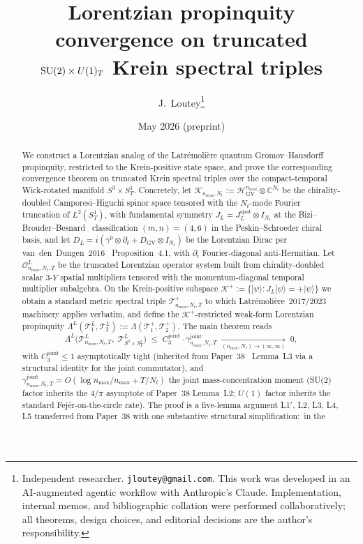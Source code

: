 \documentclass[11pt,a4paper]{article}
\title{Lorentzian propinquity convergence on truncated\\
$\SU(2)\times\Uone_{T}$ Krein spectral triples}
\author{J.~Loutey\thanks{Independent researcher. \texttt{jloutey@gmail.com}.
This work was developed in an AI-augmented agentic workflow with
Anthropic's Claude. Implementation, internal memos, and bibliographic
collation were performed collaboratively; all theorems, design choices,
and editorial decisions are the author's responsibility.}}
\date{May 2026 (preprint)}
\theoremstyle{plain}
\theoremstyle{definition}
\newcommand{\nmax}{n_{\max}}
\newcommand{\Nt}{N_{t}}
\newcommand{\SoneT}{S^{1}_{T}}
\newcommand{\Manifold}{S^{3}\times S^{1}_{T}}
\newcommand{\Krein}{\mathcal{K}}
\newcommand{\Op}{\mathcal{O}}
\newcommand{\Tcal}{\mathcal{T}}
\newcommand{\C}{\mathbb{C}}
\newcommand{\Uone}{U(1)}
\newcommand{\DGV}{D_{\mathrm{GV}}}
\newcommand{\DL}{D_{L}}
\newcommand{\JL}{J_{L}}
\newcommand{\Lprop}{\Lambda^{L}}
\newcommand{\Lambdab}{\Lambda}
\newcommand{\gammajoint}{\gamma^{\mathrm{joint}}}
\newcommand{\Cthreejoint}{C_{3}^{\mathrm{joint}}}
\newcommand{\HGV}{\mathcal{H}_{\mathrm{GV}}}
\newcommand{\Kplus}{\Krein^{+}}
\newcommand{\spat}{\mathrm{spat}}
\begin{document}
\maketitle

\begin{abstract}
We construct a Lorentzian analog of the Latr\'emoli\`ere
quantum Gromov--Hausdorff propinquity, restricted to the
Krein-positive state space, and prove the corresponding convergence
theorem on truncated Krein spectral triples over the compact-temporal
Wick-rotated manifold $\Manifold$. Concretely, let
$\Krein_{\nmax,\Nt} := \HGV^{\nmax} \otimes \C^{\Nt}$ be the
chirality-doubled Camporesi--Higuchi spinor space tensored with the
$\Nt$-mode Fourier truncation of $L^{2}(\SoneT)$, with fundamental
symmetry $\JL = \JL^{\spat} \otimes I_{\Nt}$ at the
Bizi--Brouder--Besnard~\cite{bizi_brouder_besnard2018} classification
$(m, n) = (4, 6)$ in the Peskin--Schroeder chiral basis, and let
$\DL = i(\gamma^{0} \otimes \partial_{t} + \DGV \otimes I_{\Nt})$
be the Lorentzian Dirac per van~den~Dungen~2016~\cite{vandungen2016}
Proposition~4.1, with $\partial_{t}$ Fourier-diagonal anti-Hermitian.
Let $\Op^{L}_{\nmax,\Nt,T}$ be the truncated Lorentzian operator
system built from chirality-doubled scalar $3$-$Y$ spatial multipliers
tensored with the momentum-diagonal temporal multiplier subalgebra.
On the Krein-positive subspace $\Kplus := \{|\psi\rangle :
\JL|\psi\rangle = +|\psi\rangle\}$ we obtain a standard metric
spectral triple $\Tcal_{\nmax,\Nt,T}^{+}$ to which
Latr\'emoli\`ere~2017/2023~\cite{latremoliere_metric_st_2017}
machinery applies verbatim, and define the $\Kplus$-restricted
weak-form Lorentzian propinquity $\Lprop(\Tcal_{1}^{L}, \Tcal_{2}^{L})
:= \Lambdab(\Tcal_{1}^{+}, \Tcal_{2}^{+})$. The main theorem reads
\begin{equation*}
   \Lprop\!\bigl(\Tcal^{L}_{\nmax,\Nt,T},\;
                 \Tcal^{L}_{\Manifold}\bigr)
   \;\le\; \Cthreejoint \cdot \gammajoint_{\nmax,\Nt,T}
   \;\xrightarrow[(\nmax,\Nt)\to(\infty,\infty)]{}\; 0,
\end{equation*}
with $\Cthreejoint \le 1$ asymptotically tight (inherited from
Paper~38~\cite{paper38} Lemma~L3 via a structural identity for the
joint commutator), and $\gammajoint_{\nmax,\Nt,T}
= O(\log\nmax/\nmax + T/\Nt)$ the joint mass-concentration moment
(SU(2) factor inherits the $4/\pi$ asymptote of Paper~38 Lemma~L2;
$\Uone$ factor inherits the standard Fej\'er-on-the-circle rate).
The proof is a five-lemma argument L1$'$, L2, L3, L4, L5 transferred
from Paper~38 with one substantive structural simplification:\ in the

\end{abstract}
\end{document}
